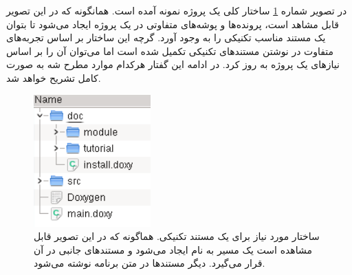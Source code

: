   در تصویر شماره \ref{standard/where-what/doc-struct} ساختار کلی یک پروژه نمونه آمده است.
  همانگونه که در این تصویر قابل مشاهد است، پرونده‌ها و پوشه‌های متفاوتی در یک
  پروژه ایجاد می‌شود تا بتوان یک مستند مناسب تکنیکی را به وجود آورد. گرچه این
  ساختار بر اساس تجربه‌های متفاوت در نوشتن مستندهای تکنیکی تکمیل شده است اما
  می‌توان آن را بر اساس نیازهای یک پروژه به روز کرد. در ادامه این گفتار هرکدام
  موارد مطرح شه به صورت کامل تشریح خواهد شد.
  \begin{figure}
    \centering
    \includegraphics[width=0.4\textwidth]{image/doc-struct}
    \caption[ساختار مورد نیاز برای ایجاد مستند تکنیکی]
    {
      ساختار مورد نیاز برای یک مستند تکنیکی. هماگونه که در این تصویر قابل مشاهده
      است یک مسیر به نام  ایجاد می‌شود و مستندهای جانبی در آن قرار
      می‌گیرد. دیگر مستندها در متن برنامه نوشته می‌شود.
    }
    \label{standard/where-what/doc-struct}
  \end{figure}






